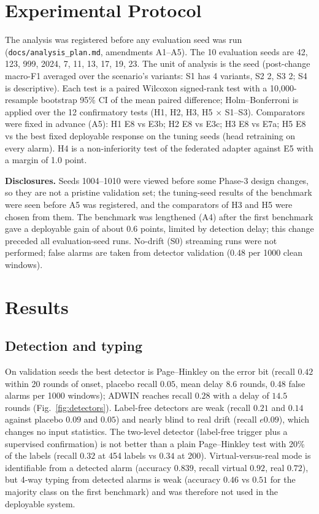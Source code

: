 \documentclass[journal]{IEEEtran}
\begin{document}
\section{Experimental Protocol}
The analysis was registered before any evaluation seed was run (\texttt{docs/analysis\_plan.md}, amendments A1--A5). The 10 evaluation seeds are 42, 123, 999, 2024, 7, 11, 13, 17, 19, 23. The unit of analysis is the seed (post-change macro-F1 averaged over the scenario's variants: S1 has 4 variants, S2 2, S3 2; S4 is descriptive). Each test is a paired Wilcoxon signed-rank test with a 10{,}000-resample bootstrap 95\% CI of the mean paired difference; Holm--Bonferroni is applied over the 12 confirmatory tests (H1, H2, H3, H5 $\times$ S1--S3). Comparators were fixed in advance (A5): H1 E8 vs E3b; H2 E8 vs E3c; H3 E8 vs E7a; H5 E8 vs the best fixed deployable response on the tuning seeds (head retraining on every alarm). H4 is a non-inferiority test of the federated adapter against E5 with a margin of 1.0 point.

\textbf{Disclosures.} Seeds 1004--1010 were viewed before some Phase-3 design changes, so they are not a pristine validation set; the tuning-seed results of the benchmark were seen before A5 was registered, and the comparators of H3 and H5 were chosen from them. The benchmark was lengthened (A4) after the first benchmark gave a deployable gain of about 0.6 points, limited by detection delay; this change preceded all evaluation-seed runs. No-drift (S0) streaming runs were not performed; false alarms are taken from detector validation (0.48 per 1000 clean windows).

\section{Results}\label{sec:results}
\subsection{Detection and typing}
On validation seeds the best detector is Page--Hinkley on the error bit (recall $0.42$ within 20 rounds of onset, placebo recall $0.05$, mean delay $8.6$ rounds, 0.48 false alarms per 1000 windows); ADWIN reaches recall $0.28$ with a delay of $14.5$ rounds (Fig.~\ref{fig:detectors}). Label-free detectors are weak (recall $0.21$ and $0.14$ against placebo $0.09$ and $0.05$) and nearly blind to real drift (recall $e 0.09$), which changes no input statistics. The two-level detector (label-free trigger plus a supervised confirmation) is not better than a plain Page--Hinkley test with 20\% of the labels (recall $0.32$ at 454 labels vs $0.34$ at 200). Virtual-versus-real mode is identifiable from a detected alarm (accuracy $0.839$, recall virtual $0.92$, real $0.72$), but 4-way typing from detected alarms is weak (accuracy $0.46$ vs $0.51$ for the majority class on the first benchmark) and was therefore not used in the deployable system.
\end{document}
